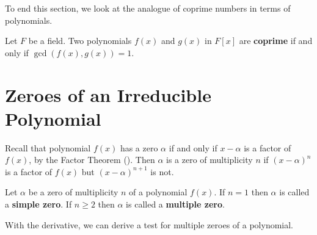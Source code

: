 To end this section, we look at the analogue of coprime numbers in terms of polynomials.

\begin{definition}
    Let $F$ be a field. Two polynomials $f(x)$ and $g(x)$ in $F[x]$ are \textbf{coprime} if and only if $\gcd(f(x), g(x)) = 1$.
\end{definition}

\section{Zeroes of an Irreducible Polynomial}
Recall that polynomial $f(x)$ has a zero $\alpha$ if and only if $x-\alpha$ is a factor of $f(x)$, by the Factor Theorem (). Then $\alpha$ is a zero of multiplicity $n$ if $(x-\alpha)^n$ is a factor of $f(x)$ but $(x-\alpha)^{n+1}$ is not.

\begin{definition}
    Let $\alpha$ be a zero of multiplicity $n$ of a polynomial $f(x)$. If $n = 1$ then $\alpha$ is called a \textbf{simple zero}. If $n \geq 2$ then $\alpha$ is called a \textbf{multiple zero}.
\end{definition}

With the derivative, we can derive a test for multiple zeroes of a polynomial.

